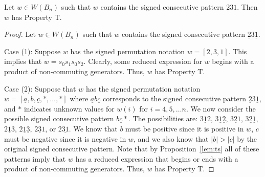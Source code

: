 \begin{proposition}\label{lem:2312}
Let $w \in W(B_n)$ such that $w$ contains the signed consecutive pattern $\underline{2}3\underline{1}$. Then $w$ has Property T.
\begin{proof}
	Let $w \in W(B_n)$ such that $w$ contains the signed consecutive pattern $\underline{2}3\underline{1}$.
	
	Case (1): Suppose $w$ has the signed permutation notation $w=[\underline{2},3,\underline{1}]$. This implies that $w=s_0s_1s_0s_2$. Clearly, some reduced expression for $w$ begins with a product of non-commuting generators. Thus, $w$ has Property T.
	
	Case (2): Suppose that $w$ has the signed permutation notation $w=[\underline{a},b,\underline{c}, \ast, \ldots, \ast]$ where $\underline{a}b\underline{c}$ corresponds to the signed consecutive pattern $\underline{2}3\underline{1}$, and $\ast$ indicates unknown values for $w(i)$ for $i=4,5, \ldots n$. We now consider the possible signed consecutive pattern $b \underline{c} \ast$. The possibilities are: $3\underline{1}2$, $3\underline{1}\underline{2}$, $3\underline{2}1$, $3 \underline{2}\underline{1}$, $2\underline{1}3$, $2\underline{1}\underline{3}$, $2\underline{3}1$, or $2 \underline{31}$. We know that $b$ must be positive since it is positive in $w$, $c$ must be negative since it is negative in $w$, and we also know that $|b|>|c|$ by the original signed consecutive pattern. Note that by Proposition~\ref{lem:ts} all of these patterns imply that $w$ has a reduced expression that begins or ends with a product of non-commuting generators. Thus, $w$ has Property T.
	

\end{proof}
\end{proposition}
